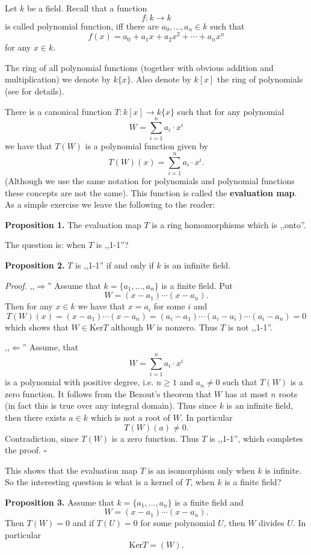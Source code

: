 \documentclass[12pt]{article}
\begin{document}
Let $k$ be a field. Recall that a function
$$f:k\to k$$
is called polynomial function, iff there are $a_0,\ldots,a_n\in k$ such that
$$f(x)=a_0+a_1x+a_2x^2+\cdots +a_nx^n$$
for any $x\in k$.

The ring of all polynomial functions (together with obvious addition and multiplication) we denote by $k\{x\}$. Also denote by $k[x]$ the ring of polynomials (see  for details).

There is a canonical function $T:k[x]\to k\{x\}$ such that for any polynomial
$$W=\sum_{i=1}^n a_i\cdot x^i$$
we have that $T(W)$ is a polynomial function given by
$$T(W)(x)=\sum_{i=1}^n a_i\cdot x^i.$$
(Although we use the same notation for polynomials and polynomial functions these concepts are not the same). This function is called the \textbf{evaluation map}. As a simple exercise we leave the following to the reader:

\textbf{Proposition 1.} The evaluation map $T$ is a ring homomorphisms which is ,,onto''.

The question is: when $T$ is ,,1-1''?

\textbf{Proposition 2.} $T$ is ,,1-1'' if and only if $k$ is an infinite field.

\textit{Proof.} ,,$\Rightarrow$'' Assume that $k=\{a_1,\ldots,a_n\}$ is a finite field. Put
$$W=(x-a_1)\cdots (x-a_n).$$
Then for any $x\in k$ we have that $x=a_i$ for some $i$ and
$$T(W)(x)=(x-a_1)\cdots (x-a_n)=(a_i-a_1)\cdots (a_i-a_i)\cdots (a_i-a_n)=0$$
which shows that $W\in\mathrm{Ker}T$ although $W$ is nonzero. Thus $T$ is not ,,1-1''.

,,$\Leftarrow$'' Assume, that
$$W=\sum_{i=1}^n a_i\cdot x^i$$
is a polynomial with positive degree, i.e. $n\geqslant 1$ and $a_n\neq 0$ such that $T(W)$ is a zero function. It follows from the Bezout's theorem that $W$ has at most $n$ roots (in fact this is true over any integral domain). Thus since $k$ is an infinite field, then there exists $a\in k$ which is not a root of $W$. In particular
$$T(W)(a)\neq 0.$$
Contradiction, since $T(W)$ is a zero function. Thus $T$ is ,,1-1'', which completes the proof. $\square$

This shows that the evaluation map $T$ is an isomorphism only when $k$ is infinite. So the interesting question is what is a kernel of $T$, when $k$ is a finite field?

\textbf{Proposition 3.} Assume that $k=\{a_1,\ldots,a_n\}$ is a finite field and
$$W=(x-a_1)\cdots (x-a_n).$$
Then $T(W)=0$ and if $T(U)=0$ for some polynomial $U$, then $W$ divides $U$. In particular 
$$\mathrm{Ker}T=(W).$$
\end{document}
